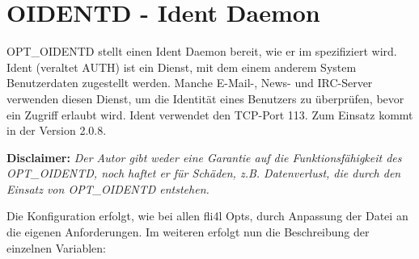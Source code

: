 \section {OIDENTD - Ident Daemon}

OPT\_OIDENTD stellt einen Ident Daemon bereit, wie er im
  
spezifiziert wird. Ident (veraltet AUTH) ist ein Dienst, mit dem einem 
anderem System Benutzerdaten zugestellt werden. Manche \mbox{E-Mail}-, News- und
IRC-Server verwenden diesen Dienst, um die Identität eines Benutzers zu
überprüfen, bevor ein Zugriff erlaubt wird. Ident verwendet den TCP-Port 113. 
Zum Einsatz kommt  in
der Version 2.0.8. 


\textbf{Disclaimer: }\emph{Der Autor gibt weder eine Garantie auf die
Funktionsfähigkeit des OPT\_\-OIDENTD, noch haftet er für Schäden, z.B.
Datenverlust, die durch den Einsatz von OPT\_\-OIDENTD entstehen.}



Die Konfiguration erfolgt, wie bei allen fli4l Opts, durch Anpassung der Datei
 an die eigenen Anforderungen. Im
weiteren erfolgt nun die Beschreibung der einzelnen Variablen: 


